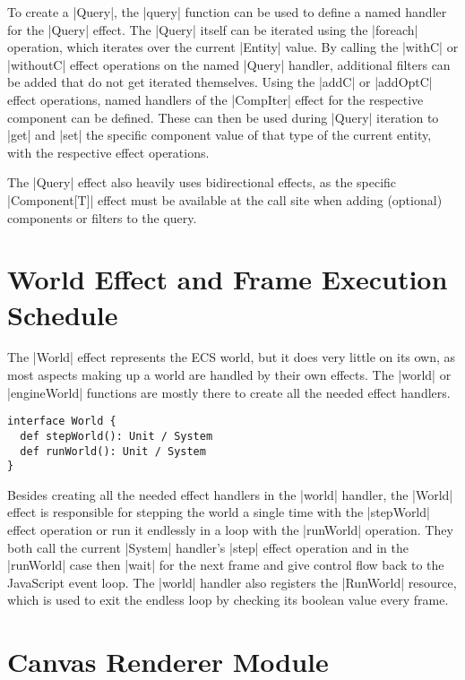 To create a |Query|, the |query| function can be used to define a named handler for the |Query| effect. The |Query| itself can be iterated using the |foreach| operation, which iterates over the current |Entity| value. By calling the |withC| or |withoutC| effect operations on the named |Query| handler, additional filters can be added that do not get iterated themselves. Using the |addC| or |addOptC| effect operations, named handlers of the |CompIter| effect for the respective component can be defined. These can then be used during |Query| iteration to |get| and |set| the specific component value of that type of the current entity, with the respective effect operations.

The |Query| effect also heavily uses bidirectional effects, as the specific |Component[T]| effect must be available at the call site when adding (optional) components or filters to the query.

\section{World Effect and Frame Execution Schedule}

The |World| effect represents the ECS world, but it does very little on its own, as most aspects making up a world are handled by their own effects. The |world| or |engineWorld| functions are mostly there to create all the needed effect handlers.

\begin{lstlisting}[caption=World signature]
interface World {
  def stepWorld(): Unit / System
  def runWorld(): Unit / System
}
\end{lstlisting}

Besides creating all the needed effect handlers in the |world| handler, the |World| effect is responsible for stepping the world a single time with the |stepWorld| effect operation or run it endlessly in a loop with the |runWorld| operation. They both call the current |System| handler's |step| effect operation and in the |runWorld| case then |wait| for the next frame and give control flow back to the JavaScript event loop. The |world| handler also registers the |RunWorld| resource, which is used to exit the endless loop by checking its boolean value every frame.

\section{Canvas Renderer Module}

